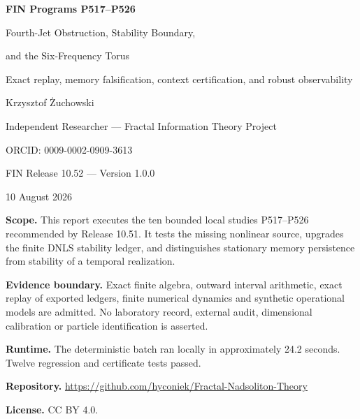 \documentclass[11pt,a4paper]{article}
\begin{document}
\begin{titlepage}
\centering
\vspace*{2.0cm}
{\LARGE\bfseries FIN Programs P517--P526\par}
\vspace{0.7cm}
{\Large Fourth-Jet Obstruction, Stability Boundary,\par and the Six-Frequency Torus\par}
\vspace{0.5cm}
{\large Exact replay, memory falsification, context certification, and robust observability\par}
\vspace{1.6cm}
{\Large Krzysztof Żuchowski\par}
\vspace{0.3cm}
{\large Independent Researcher --- Fractal Information Theory Project\par}
{\large ORCID: 0009-0002-0909-3613\par}
\vspace{1.4cm}
{\large FIN Release 10.52 --- Version 1.0.0\par}
{\large 10 August 2026\par}
\vfill
\begin{minipage}{0.82\textwidth}
\textbf{Scope.} This report executes the ten bounded local studies P517--P526 recommended by Release 10.51. It tests the missing nonlinear source, upgrades the finite DNLS stability ledger, and distinguishes stationary memory persistence from stability of a temporal realization.\par
\textbf{Evidence boundary.} Exact finite algebra, outward interval arithmetic, exact replay of exported ledgers, finite numerical dynamics and synthetic operational models are admitted. No laboratory record, external audit, dimensional calibration or particle identification is asserted.\par
\textbf{Runtime.} The deterministic batch ran locally in approximately 24.2 seconds. Twelve regression and certificate tests passed.\par
\textbf{Repository.} \url{https://github.com/hyconiek/Fractal-Nadsoliton-Theory}\par
\textbf{License.} CC BY 4.0.
\end{minipage}
\end{titlepage}
\end{document}
